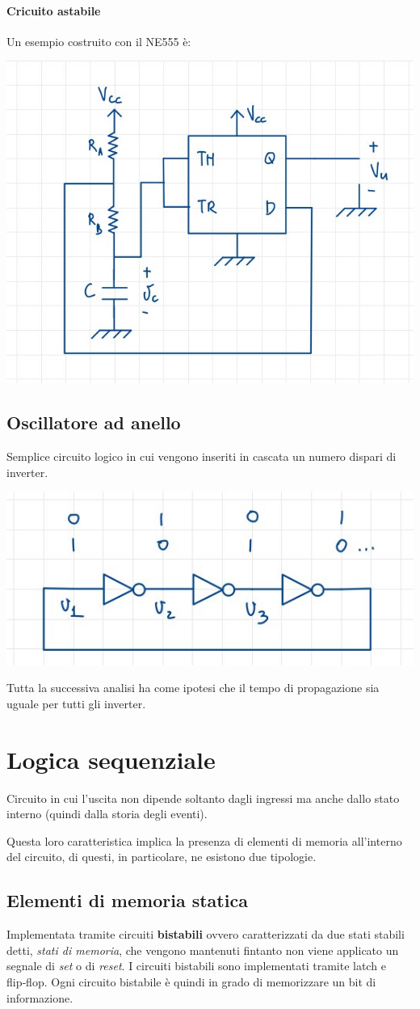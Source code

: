 \documentclass[11pt,a4paper,]{article}
\begin{document}
\paragraph{Cricuito astabile}
Un esempio costruito con il NE555 è:
\begin{center}
	\includegraphics[width=0.3\linewidth]{"img/ne555 astabile"}
\end{center}

\subsection{Oscillatore ad anello}
Semplice circuito logico in cui vengono inseriti in cascata un numero dispari di inverter.
\begin{center}
	\includegraphics[width=0.3\linewidth]{"img/oscill an"}
\end{center}
\begin{nota}
	Tutta la successiva analisi ha come ipotesi che il tempo di propagazione sia uguale per tutti gli inverter.
\end{nota}

\section{Logica sequenziale}
\begin{definizione}
	Circuito in cui l'uscita non dipende soltanto dagli ingressi ma anche dallo stato interno (quindi dalla storia degli eventi).
\end{definizione}
Questa loro caratteristica implica la presenza di elementi di memoria all'interno del circuito, di questi, in particolare, ne esistono due tipologie.

\subsection{Elementi di memoria statica}
Implementata tramite circuiti \textbf{bistabili} ovvero caratterizzati da due stati stabili detti, \textit{stati di memoria}, che vengono mantenuti fintanto non viene applicato un segnale di \textit{set} o di \textit{reset}.
I circuiti bistabili sono implementati tramite latch e flip‑flop. Ogni circuito bistabile è quindi in grado di memorizzare un bit di informazione.
\end{document}
